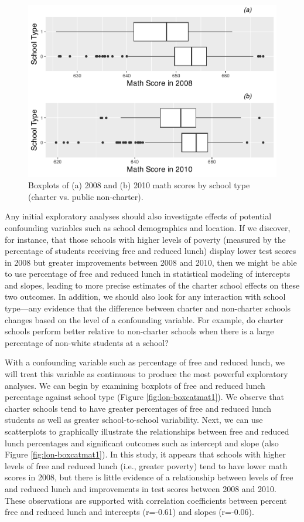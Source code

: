 \documentclass[
]{krantz}
\begin{document}
\begin{figure}

{\centering \includegraphics[width=0.6\linewidth]{bookdown-BeyondMLR_files/figure-latex/lon-box3-1} 

}

\caption{Boxplots of (a) 2008 and (b) 2010 math scores by school type (charter vs. public non-charter).}\label{fig:lon-box3}
\end{figure}

Any initial exploratory analyses should also investigate effects of potential confounding variables such as school demographics and location. If we discover, for instance, that those schools with higher levels of poverty (measured by the percentage of students receiving free and reduced lunch) display lower test scores in 2008 but greater improvements between 2008 and 2010, then we might be able to use percentage of free and reduced lunch in statistical modeling of intercepts and slopes, leading to more precise estimates of the charter school effects on these two outcomes. In addition, we should also look for any interaction with school type---any evidence that the difference between charter and non-charter schools changes based on the level of a confounding variable. For example, do charter schools perform better relative to non-charter schools when there is a large percentage of non-white students at a school?

With a confounding variable such as percentage of free and reduced lunch, we will treat this variable as continuous to produce the most powerful exploratory analyses. We can begin by examining boxplots of free and reduced lunch percentage against school type (Figure \ref{fig:lon-boxcatmat1}). We observe that charter schools tend to have greater percentages of free and reduced lunch students as well as greater school-to-school variability. Next, we can use scatterplots to graphically illustrate the relationships between free and reduced lunch percentages and significant outcomes such as intercept and slope (also Figure \ref{fig:lon-boxcatmat1}). In this study, it appears that schools with higher levels of free and reduced lunch (i.e., greater poverty) tend to have lower math scores in 2008, but there is little evidence of a relationship between levels of free and reduced lunch and improvements in test scores between 2008 and 2010. These observations are supported with correlation coefficients between percent free and reduced lunch and intercepts (r=-0.61) and slopes (r=-0.06).
\end{document}
